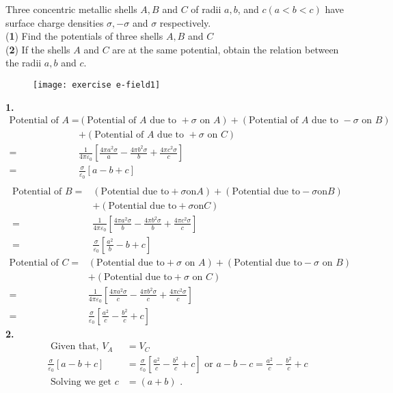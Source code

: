 \begin{exercise}
	Three concentric metallic shells $A, B$ and $C$ of radii $a, b$, and $c(a<b<c)$ have surface charge densities
	$\sigma,-\sigma$ and $\sigma$ respectively.\\
	(\textbf{1}) Find the potentials of three shells $A, B$ and $C$\\
	(\textbf{2}) If the shells $A$ and $C$ are at the same potential, obtain the relation between the radii $a, b$ and $c .$
	\begin{figure}[H]
		\begin{center}
			\texttt{[image: exercise e-field1]}
		\end{center}
	\end{figure}
\end{exercise}
\begin{answer}\textbf{1.}\\
	\begin{align*}
	\text{Potential of } A =&(\text{Potential of } A \text{ due to }+\sigma \text{ on }A)+(\text{Potential of } A \text{ due to }-\sigma \text{ on }B)\\&+(\text{Potential of } A \text{ due to }+\sigma \text{ on }C)\\
	=&\frac{1}{4 \pi \varepsilon_{0}}\left[\frac{4 \pi a^{2} \sigma}{a}-\frac{4 \pi b^{2} \sigma}{b}+\frac{4 \pi c^{2} \sigma}{c}\right]\\
	=&\frac{\sigma}{\varepsilon_{0}}[a-b+c]\\
	\end{align*}
	\begin{align*}
\text{Potential of } B =&( \text{Potential due to} +\sigma \text{on} A)+( \text{Potential due to} -\sigma \text{on} B)\\&+( \text{Potential due to} +\sigma \text{on} C)\\
=&\frac{1}{4 \pi \varepsilon_{0}}\left[\frac{4 \pi a^{2} \sigma}{b}-\frac{4 \pi b^{2} \sigma}{b}+\frac{4 \pi c^{2} \sigma}{c}\right]\\
=&\frac{\sigma}{\varepsilon_{0}}\left[\frac{a^{2}}{b}-b+c\right]
	\end{align*}
	\begin{align*}	
	\text{Potential of } C =&( \text{Potential due to}  +\sigma \text{ on } A)+( \text{Potential due to} -\sigma \text{ on } B)\\&+( \text{Potential due to} +\sigma \text{ on } C)\\
	=&\frac{1}{4 \pi \varepsilon_{0}}\left[\frac{4 \pi a^{2} \sigma}{c}-\frac{4 \pi b^{2} \sigma}{c}+\frac{4 \pi c^{2} \sigma}{c}\right]\\
	=&\frac{\sigma}{\varepsilon_{0}}\left[\frac{a^{2}}{c}-\frac{b^{2}}{c}+c\right]
	\end{align*}
	\textbf{2.}\\
	\begin{align*}
		\text { Given that, } V_{A}&=V_{C}\\
		\frac{\sigma}{\varepsilon_{0}}[a-b+c]&=\frac{\sigma}{\varepsilon_{0}}\left[\frac{a^{2}}{c}-\frac{b^{2}}{c}+c\right] \text { or } a-b-c=\frac{a^{2}}{c}-\frac{b^{2}}{c}+c\\
		\text { Solving we get } c&=(a+b) \text { . }
	\end{align*}


\end{answer}
